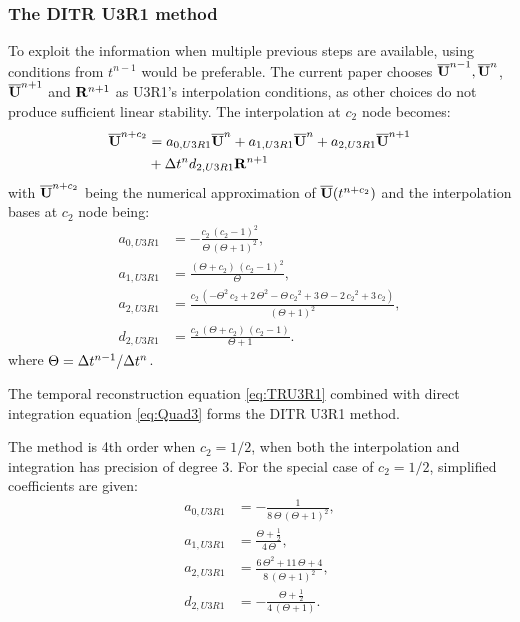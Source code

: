 \documentclass[preprint,12pt]{elsarticle}
\begin{document}
\subsubsection{The DITR U3R1 method}

To exploit the information when multiple previous
steps are available,
using conditions from $t^{n-1}$ would be
preferable.
The current paper chooses $\overline{\mathbf{U}}^{n-1},\overline{\mathbf{U}}^{n}$, $\overline{\mathbf{U}}^{n+1}$
and $\mathbf{R}^{n+1}$ as U3R1's interpolation conditions,
as other choices do not produce sufficient linear stability.
The interpolation at $c_2$ node becomes:
\begin{equation}
    \begin{aligned}
        \label{eq:TRU3R1}
        \overline{\mathbf{U}}^{n+c_2} & =
        a_{0,U3R1}\overline{\mathbf{U}}^{n} +
        a_{1,U3R1}\overline{\mathbf{U}}^{n} +
        a_{2,U3R1}\overline{\mathbf{U}}^{n + 1}
        \\ & +
        \mathrm\Delta t^n d_{2,U3R1}\mathbf{R}^{n + 1}
    \end{aligned}
\end{equation}
with $\overline{\mathbf{U}}^{n+c_2}$ being
the numerical approximation
of $\overline{\mathbf{U}}(t^{n+c_2})$
and the interpolation bases at $c_2$ node being:
\begin{equation}
    \begin{aligned}
        a_{0,U3R1} & = -\frac{c_{2}\,{\left(c_{2}-1\right)}^2}{\Theta\,{\left(\Theta+1\right)}^2}       ,                                                     \\
        a_{1,U3R1} & = \frac{\left(\Theta+c_{2}\right)\,{\left(c_{2}-1\right)}^2}{\Theta}                     ,                                               \\
        a_{2,U3R1} & =  \frac{c_{2}\,\left(-\Theta^2\,c_{2}+2\,\Theta^2-\Theta\,{c_{2}}^2+3\,\Theta-2\,{c_{2}}^2+3\,c_{2}\right)}{{\left(\Theta+1\right)}^2} ,\\
        d_{2,U3R1} & =   \frac{c_{2}\,\left(\Theta+c_{2}\right)\,\left(c_{2}-1\right)}{\Theta+1}.
    \end{aligned}
    \label{eq:interpU3R1}
\end{equation}
where $\Theta = \mathrm\Delta t^{n-1}/\mathrm\Delta t^{n}$.

The temporal reconstruction equation \eqref{eq:TRU3R1}
combined with direct integration equation \eqref{eq:Quad3}
forms the DITR U3R1 method.

The method is 4th order when $c_2=1/2$, when
both the interpolation and integration has precision
of degree 3.
For the special case of $c_2=1/2$, simplified
coefficients are given:
\begin{equation}
    \begin{aligned}
        a_{0,U3R1} & = -\frac{1}{8\,\Theta\,{\left(\Theta+1\right)}^2}  ,              \\
        a_{1,U3R1} & = \frac{\Theta+\frac{1}{2}}{4\,\Theta}        ,                   \\
        a_{2,U3R1} & =  \frac{6\,\Theta^2+11\,\Theta+4}{8\,{\left(\Theta+1\right)}^2}, \\
        d_{2,U3R1} & = -\frac{\Theta+\frac{1}{2}}{4\,\left(\Theta+1\right)}.
    \end{aligned}
    \label{eq:interpU3R1-S}
\end{equation}
\end{document}
